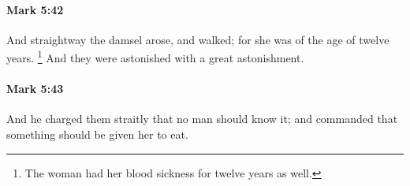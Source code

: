 		\paragraph{Mark 5:42} %
			\label{MARK-5-42}

			And straightway the damsel arose, and walked; for she was of the age of twelve years.%
				\footnote{%
					The woman had her blood sickness for twelve years as well. 
					}
			And they were astonished with a great astonishment.

			\begin{framed}
			\scriptsize
				\begin{compactdesc}
					\item[SBLG] 
				\end{compactdesc}
			\end{framed}

		\paragraph{Mark 5:43} %
			\label{MARK-5-43}

			And he charged them straitly that no man should know it; and commanded that something should be given her to eat.

